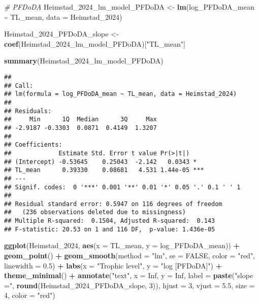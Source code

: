 \documentclass[
]{article}
\newenvironment{Shaded}{\begin{snugshade}}{\end{snugshade}}
\newcommand{\AttributeTok}[1]{\textcolor[rgb]{0.13,0.29,0.53}{#1}}
\newcommand{\CommentTok}[1]{\textcolor[rgb]{0.56,0.35,0.01}{\textit{#1}}}
\newcommand{\ConstantTok}[1]{\textcolor[rgb]{0.56,0.35,0.01}{#1}}
\newcommand{\DecValTok}[1]{\textcolor[rgb]{0.00,0.00,0.81}{#1}}
\newcommand{\FloatTok}[1]{\textcolor[rgb]{0.00,0.00,0.81}{#1}}
\newcommand{\FunctionTok}[1]{\textcolor[rgb]{0.13,0.29,0.53}{\textbf{#1}}}
\newcommand{\NormalTok}[1]{#1}
\newcommand{\OtherTok}[1]{\textcolor[rgb]{0.56,0.35,0.01}{#1}}
\newcommand{\SpecialCharTok}[1]{\textcolor[rgb]{0.81,0.36,0.00}{\textbf{#1}}}
\newcommand{\StringTok}[1]{\textcolor[rgb]{0.31,0.60,0.02}{#1}}
\begin{document}
\begin{Shaded}
\begin{Highlighting}[]
\CommentTok{\# PFDoDA}
\NormalTok{Heimstad\_2024\_lm\_model\_PFDoDA }\OtherTok{\textless{}{-}} \FunctionTok{lm}\NormalTok{(log\_PFDoDA\_mean }\SpecialCharTok{\textasciitilde{}}\NormalTok{ TL\_mean,}
                                    \AttributeTok{data =}\NormalTok{ Heimstad\_2024)}

\NormalTok{Heimstad\_2024\_PFDoDA\_slope }\OtherTok{\textless{}{-}} \FunctionTok{coef}\NormalTok{(Heimstad\_2024\_lm\_model\_PFDoDA)[}\StringTok{"TL\_mean"}\NormalTok{]}

\FunctionTok{summary}\NormalTok{(Heimstad\_2024\_lm\_model\_PFDoDA)}
\end{Highlighting}
\end{Shaded}

\begin{verbatim}
## 
## Call:
## lm(formula = log_PFDoDA_mean ~ TL_mean, data = Heimstad_2024)
## 
## Residuals:
##     Min      1Q  Median      3Q     Max 
## -2.9187 -0.3303  0.0871  0.4149  1.3207 
## 
## Coefficients:
##             Estimate Std. Error t value Pr(>|t|)    
## (Intercept) -0.53645    0.25043  -2.142   0.0343 *  
## TL_mean      0.39330    0.08681   4.531 1.44e-05 ***
## ---
## Signif. codes:  0 '***' 0.001 '**' 0.01 '*' 0.05 '.' 0.1 ' ' 1
## 
## Residual standard error: 0.5947 on 116 degrees of freedom
##   (236 observations deleted due to missingness)
## Multiple R-squared:  0.1504, Adjusted R-squared:  0.143 
## F-statistic: 20.53 on 1 and 116 DF,  p-value: 1.436e-05
\end{verbatim}

\begin{Shaded}
\begin{Highlighting}[]
\FunctionTok{ggplot}\NormalTok{(Heimstad\_2024, }\FunctionTok{aes}\NormalTok{(}\AttributeTok{x =}\NormalTok{ TL\_mean, }\AttributeTok{y =}\NormalTok{ log\_PFDoDA\_mean)) }\SpecialCharTok{+}
  \FunctionTok{geom\_point}\NormalTok{() }\SpecialCharTok{+}
  \FunctionTok{geom\_smooth}\NormalTok{(}\AttributeTok{method =} \StringTok{"lm"}\NormalTok{, }\AttributeTok{se =} \ConstantTok{FALSE}\NormalTok{, }\AttributeTok{color =} \StringTok{"red"}\NormalTok{, }\AttributeTok{linewidth =} \FloatTok{0.5}\NormalTok{) }\SpecialCharTok{+}
  \FunctionTok{labs}\NormalTok{(}\AttributeTok{x =} \StringTok{"Trophic level"}\NormalTok{,}
       \AttributeTok{y =} \StringTok{"log [PFDoDA]"}\NormalTok{) }\SpecialCharTok{+}
  \FunctionTok{theme\_minimal}\NormalTok{() }\SpecialCharTok{+}
  \FunctionTok{annotate}\NormalTok{(}\StringTok{"text"}\NormalTok{, }\AttributeTok{x =} \ConstantTok{Inf}\NormalTok{, }\AttributeTok{y =} \ConstantTok{Inf}\NormalTok{, }\AttributeTok{label =} \FunctionTok{paste}\NormalTok{(}\StringTok{"slope ="}\NormalTok{, }\FunctionTok{round}\NormalTok{(Heimstad\_2024\_PFDoDA\_slope, }\DecValTok{3}\NormalTok{)), }
           \AttributeTok{hjust =} \DecValTok{3}\NormalTok{, }\AttributeTok{vjust =} \FloatTok{5.5}\NormalTok{, }\AttributeTok{size =} \DecValTok{4}\NormalTok{, }\AttributeTok{color =} \StringTok{"red"}\NormalTok{)}
\end{Highlighting}
\end{Shaded}
\end{document}
